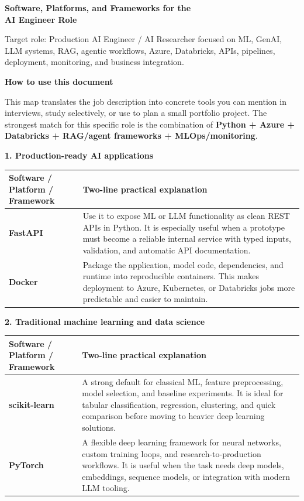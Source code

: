 \documentclass[11pt,a4paper]{article}
\newcommand{\sectiontitle}[1]{%
    \vspace{0.35em}
    {\Large\bfseries\color{navy}#1}\par
    \vspace{0.25em}
}
\newenvironment{tooltable}
{%
    \noindent
    \begin{tabular}{|L{0.27\textwidth}|L{0.68\textwidth}|}
    \hline
    \rowcolor{navy}
    \color{white}\bfseries Software / Platform / Framework &
    \color{white}\bfseries Two-line practical explanation \\
    \hline
}
{%
    \end{tabular}
    \vspace{0.35em}
}
\begin{document}
    
    \begin{center}
        {\fontsize{23}{27}\selectfont\bfseries\color{navy}
        Software, Platforms, and Frameworks for the\\[2pt]
        AI Engineer Role}
    \end{center}
    
    \vspace{0.45em}
    
    \begin{center}
        \large\color{textgray}
        Target role: Production AI Engineer / AI Researcher focused on ML, GenAI,
        LLM systems, RAG, agentic workflows, Azure, Databricks, APIs, pipelines,
        deployment, monitoring, and business integration.
    \end{center}
    
    \vspace{0.7em}
    
    \sectiontitle{How to use this document}
    
    This map translates the job description into concrete tools you can mention
    in interviews, study selectively, or use to plan a small portfolio project.
    The strongest match for this specific role is the combination of
    \textbf{Python + Azure + Databricks + RAG/agent frameworks + MLOps/monitoring}.
    
    \sectiontitle{1. Production-ready AI applications}
    
    \begin{tooltable}
        \textbf{FastAPI} &
        Use it to expose ML or LLM functionality as clean REST APIs in Python.
        It is especially useful when a prototype must become a reliable internal
        service with typed inputs, validation, and automatic API documentation. \\
        \hline
        \textbf{Docker} &
        Package the application, model code, dependencies, and runtime into
        reproducible containers. This makes deployment to Azure, Kubernetes, or
        Databricks jobs more predictable and easier to maintain. \\
        \hline
    \end{tooltable}
    
    \sectiontitle{2. Traditional machine learning and data science}
    
    \begin{tooltable}
        \textbf{scikit-learn} &
        A strong default for classical ML, feature preprocessing, model selection,
        and baseline experiments. It is ideal for tabular classification, regression,
        clustering, and quick comparison before moving to heavier deep learning
        solutions. \\
        \hline
        \textbf{PyTorch} &
        A flexible deep learning framework for neural networks, custom training loops,
        and research-to-production workflows. It is useful when the task needs deep
        models, embeddings, sequence models, or integration with modern LLM tooling. \\
        \hline
    \end{tooltable}
    
\end{document}
